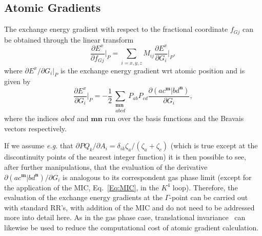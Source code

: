 \documentclass[prl,twocolumn,showpacs,twocolumngrid,superbib]{revtex4}
\begin{document}
\subsection{Atomic Gradients}
The exchange energy gradient with respect to the fractional coordinate 
$f_{Gj}$ can be obtained through the linear transform 
\begin{equation*}
 \frac{\partial E^x}{\partial f_{Gj}}\bigg|_P=\sum_{i=x,y,z}M_{ij}\frac{\partial E^x}{\partial G_i}\bigg|_P,
\end{equation*}
where $\partial E^x/\partial G_i|_P$ is the exchange energy gradient wrt atomic position and
is given by
\begin{equation}\label{Eq:Grad}
  \frac{\partial E^x}{\partial G_i}\bigg|_P =
  -\frac{1}{2}\sum_{\substack{\mathbf{m}\mathbf{n}\\a b c d}}P_{ab}P_{cd}
  \frac{\partial(ac^\mathbf{m}|bd^\mathbf{n})}{\partial G_i},
\end{equation}
where the indices $abcd$ and $\mathbf{mn}$ run over the basis functions and the
Bravais vectors respectively.

If we assume {\it e.g.} that $\partial PQ_k/\partial A_i=\delta_{ik}\zeta_a/(\zeta_a+\zeta_c)$
(which is true except at the discontinuity points of the nearest integer function) 
it is then possible to see, after further manipulations, 
that the evaluation of the derivative $\partial(ac^\mathbf{m}|bd^\mathbf{n})/\partial G_i$
is analogous to its correspondent gas phase
limit (except for the application of the MIC, Eq.~\ref{Eq:MIC}, in the $K^4$ loop). 
Therefore, the evaluation of the exchange energy gradients at the $\Gamma$-point
can be carried out with standard RR's, with addition of the MIC and do not need to be addressed more 
into detail here. As in the gas phase case, translational 
invariance~\cite{AKorminicki77} can likewise be used to reduce the 
computational cost of atomic gradient calculation.
\end{document}
